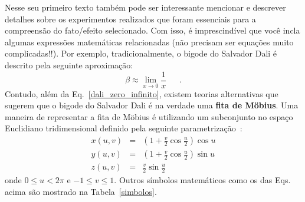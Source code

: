 \documentclass[a4wide]{report}
\begin{document}

	Nesse seu primeiro texto também pode ser interessante mencionar e descrever
detalhes sobre os experimentos realizados que foram essenciais para a compreensão 
do fato/efeito selecionado.
	Com isso, é imprescindível que você incla algumas expressões matemáticas 
relacionadas (não precisam ser equações muito complicadas!!).
	Por exemplo, tradicionalmente, o bigode do Salvador Dali é descrito pela
seguinte aproximação:
\begin{equation}
\beta \approx \lim_{x\to 0} \frac{1}{x}
~~~~~~~.
\label{dali_zero_infinito}
\end{equation}
	Contudo, além da Eq.~\ref{dali_zero_infinito}, existem teorias alternativas 
que sugerem que o bigode do Salvador Dali é na verdade uma {\bf fita de M\"obius}.
	Uma maneira de representar a fita de M\"obius é utilizando um subconjunto 
no espaço Euclidiano tridimensional definido pela seguinte parametrização~\cite{mobius}:
\begin{eqnarray}
x(u,v) &=& \left( 1 + \frac{v}{2} \cos \frac{u}{2} \right) \cos u \label{mobius_strip_a} \\
y(u,v) &=& \left( 1 + \frac{v}{2} \cos \frac{u}{2} \right) \sin u \label{mobius_strip_b} \\
z(u,v) &=& \frac{v}{2} \sin \frac{u}{2} \label{mobius_strip_c}
\end{eqnarray}
onde $0\leq u < 2\pi$ e $-1\leq v \leq 1$. 
	Outros símbolos matemáticos como os das Eqs. acima são mostrado na Tabela~\ref{simbolos}.
\end{document}
